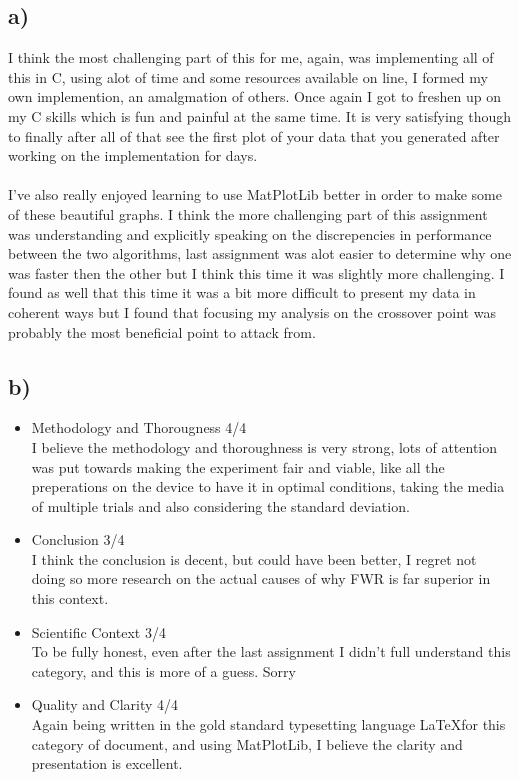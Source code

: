 \documentclass{article}
\begin{document}
\subsection*{a)}
I think the most challenging part of this for me, again, was implementing all of this in C, using alot of time and some resources available on line, I formed my own implemention, an amalgmation of others. Once again I got to freshen up on my C skills which is fun and painful at the same time. It is very satisfying though to finally after all of that see the first plot of your data that you generated after working on the implementation for days.\\\\ I've also really enjoyed learning to use MatPlotLib better in order to make some of these beautiful graphs. I think the more challenging part of this assignment was understanding and explicitly speaking on the discrepencies in performance between the two algorithms, last assignment was alot easier to determine why one was faster then the other but I think this time it was slightly more challenging. I found as well that this time it was a bit more difficult to present my data in coherent ways but I found that focusing my analysis on the crossover point was probably the most beneficial point to attack from. 

\subsection*{b)}
\begin{itemize}
    \item Methodology and Thorougness 4/4\\
    I believe the methodology and thoroughness is very strong, lots of attention was put towards making the experiment fair and viable, like all the preperations on the device to have it in optimal conditions, taking the media of multiple trials and also considering the standard deviation. 
    \item Conclusion 3/4\\
    I think the conclusion is decent, but could have been better, I regret not doing so more research on the actual causes of why FWR is far superior in this context. 
    \item Scientific Context 3/4\\
    To be fully honest, even after the last assignment I didn't full understand this category, and this is more of a guess. Sorry 
    \item Quality and Clarity 4/4\\
    Again being written in the gold standard typesetting language \LaTeX  for this category of document, and using MatPlotLib, I believe the clarity and presentation is excellent.
\end{itemize}
\end{document}

